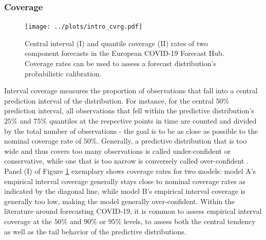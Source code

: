 \subsubsection{Coverage}
\begin{figure}
\centering
\texttt{[image: ../plots/intro\_cvrg.pdf]}
\caption{Central interval (I) and quantile coverage (II) rates of two component forecasts in the European COVID-19 Forecast Hub. Coverage rates can be used to assess a forecast distribution's probabilistic calibration. }
\label{fig:intro_cvg}
\end{figure}
Interval coverage measures the proportion of observations that fall into a central prediction interval of the distribution. For instance, for the central $50\%$ prediction interval, all observations that fell within the predictive distribution's $25\%$ and $75\%$ quantiles at the respective points in time are counted and divided by the total number of observations - the goal is to be as close as possible to the nominal coverage rate of $50\%$. Generally, a predictive distribution that is too wide and thus covers too many observations is called under-confident or conservative, while one that is too narrow is conversely called over-confident \citep{bosse_evaluating_2022}. Panel (I) of Figure \ref{fig:intro_cvg} exemplary shows coverage rates for two models: model A's empirical interval coverage generally stays close to nominal coverage rates as indicated by the diagonal line, while model B's empirical interval coverage is generally too low, making the model generally over-confident. %
Within the literature around forecasting COVID-19, it is common to assess empirical interval coverage at the $50\%$ and $90\%$ or $95\%$ levels, to assess both the central tendency as well as the tail behavior of the predictive distributions.\medskip\\%
